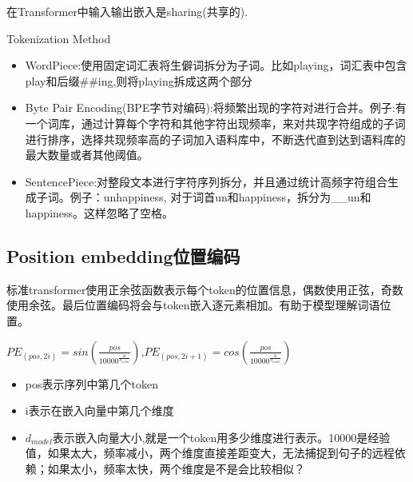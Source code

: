 \documentclass[UTF8]{ctexart}
\begin{document}
在Transformer中输入输出嵌入是sharing(共享的).

Tokenization Method
\begin{itemize}
    \item WordPiece:使用固定词汇表将生僻词拆分为子词。比如playing，词汇表中包含play和后缀\#\#ing,则将playing拆成这两个部分
    \item Byte Pair Encoding(BPE字节对编码):将频繁出现的字符对进行合并。例子:有一个词库，通过计算每个字符和其他字符出现频率，来对共现字符组成的子词进行排序，选择共现频率高的子词加入语料库中，不断迭代直到达到语料库的最大数量或者其他阈值。
    \item SentencePiece:对整段文本进行字符序列拆分，并且通过统计高频字符组合生成子词。例子：unhappiness, 对于词首un和happiness，拆分为\_\_un和happiness。这样忽略了空格。
\end{itemize}

\subsection{Position embedding位置编码}

标准transformer使用正余弦函数表示每个token的位置信息，偶数使用正弦，奇数使用余弦。最后位置编码将会与token嵌入逐元素相加。有助于模型理解词语位置。

$PE_{(pos,2i)}=sin(\frac{pos}{10000^{\frac{2i}{d_{model}}}})$,$PE_{(pos,2i+1)}=cos(\frac{pos}{10000^{\frac{2i}{d_{model}}}})$
\begin{itemize}
    \item pos表示序列中第几个token
    \item i表示在嵌入向量中第几个维度
    \item $d_{model}$表示嵌入向量大小,就是一个token用多少维度进行表示。10000是经验值，如果太大，频率减小，两个维度直接差距变大，无法捕捉到句子的远程依赖；如果太小，频率太快，两个维度是不是会比较相似？
\end{itemize}
\end{document}
